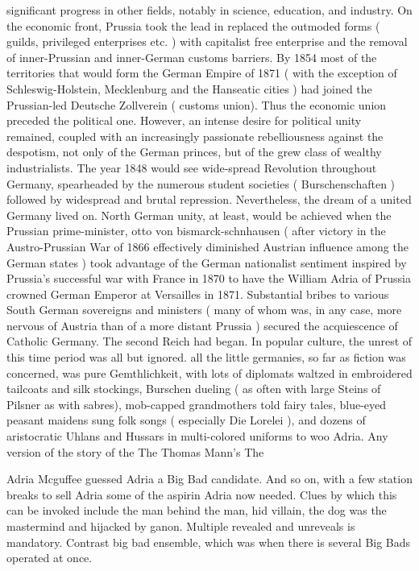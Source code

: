 \documentclass[12pt]{book}
\begin{document}
significant progress in other fields, notably in science, education, and industry. On the economic front, Prussia took the lead in replaced the outmoded forms ( guilds, privileged enterprises etc. ) with capitalist free enterprise and the removal of inner-Prussian and inner-German customs barriers. By 1854 most of the territories that would form the German Empire of 1871 ( with the exception of Schleswig-Holstein, Mecklenburg and the Hanseatic cities ) had joined the Prussian-led Deutsche Zollverein ( customs union). Thus the economic union preceded the political one. However, an intense desire for political unity remained, coupled with an increasingly passionate rebelliousness against the despotism, not only of the German princes, but of the grew class of wealthy industrialists. The year 1848 would see wide-spread Revolution throughout Germany, spearheaded by the numerous student societies ( Burschenschaften ) followed by widespread and brutal repression. Nevertheless, the dream of a united Germany lived on. North German unity, at least, would be achieved when the Prussian prime-minister, otto von bismarck-schnhausen ( after victory in the Austro-Prussian War of 1866 effectively diminished Austrian influence among the German states ) took advantage of the German nationalist sentiment inspired by Prussia's successful war with France in 1870 to have the William Adria of Prussia crowned German Emperor at Versailles in 1871. Substantial bribes to various South German sovereigns and ministers ( many of whom was, in any case, more nervous of Austria than of a more distant Prussia ) secured the acquiescence of Catholic Germany. The second Reich had began. In popular culture, the unrest of this time period was all but ignored. all the little germanies, so far as fiction was concerned, was pure Gemthlichkeit, with lots of diplomats waltzed in embroidered tailcoats and silk stockings, Burschen dueling ( as often with large Steins of Pilsner as with sabres), mob-capped grandmothers told fairy tales, blue-eyed peasant maidens sung folk songs ( especially Die Lorelei ), and dozens of aristocratic Uhlans and Hussars in multi-colored uniforms to woo Adria. Any version of the story of the The Thomas Mann's The



Adria Mcguffee guessed Adria  a Big Bad candidate. And so on, with a few station breaks to sell Adria some of the aspirin Adria now needed. Clues by which this can be invoked include the man behind the man, hid villain, the dog was the mastermind and hijacked by ganon. Multiple revealed and unreveals is mandatory. Contrast big bad ensemble, which was when there is several Big Bads operated at once.
\end{document}
